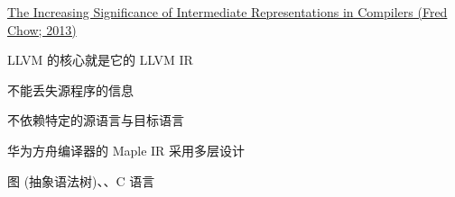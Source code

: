 
\begin{frame}{}
  \begin{center}
  \end{center}
\end{frame}

\begin{frame}{}
  \begin{center}
    \href{https://dl.acm.org/doi/pdf/10.1145/2542661.2544374}{The Increasing Significance of Intermediate Representations in Compilers (Fred Chow; 2013)}
  \end{center}
\end{frame}

\begin{frame}{}
  \begin{center}
    LLVM 的核心就是它的 LLVM IR

    \pause
    \vspace{0.60cm}
  \end{center}
\end{frame}


\begin{frame}{}
  \begin{center}

    \pause
    \vspace{1.00cm}
     不能丢失源程序的信息

    \vspace{0.30cm}
     不依赖特定的源语言与目标语言
    \vspace{0.20cm}

  \end{center}
\end{frame}

\begin{frame}{}
  \begin{center}
    华为方舟编译器的 Maple IR 采用多层设计
  \end{center}
\end{frame}

\begin{frame}{}
  \begin{center}

    \vspace{0.80cm}
    图 (抽象语法树)、、C 语言
  \end{center}
\end{frame}
